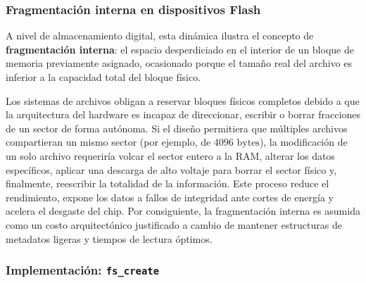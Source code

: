 \documentclass[12pt,letterpaper]{article}
\begin{document}
\subsubsection*{Fragmentación interna en dispositivos Flash}
A nivel de almacenamiento digital, esta dinámica ilustra el concepto de \textbf{fragmentación interna}: el
espacio desperdiciado en el interior de un bloque de memoria previamente asignado, ocasionado porque el tamaño
real del archivo es inferior a la capacidad total del bloque físico.

Los sistemas de archivos obligan a reservar bloques físicos completos debido a que la arquitectura del hardware
es incapaz de direccionar, escribir o borrar fracciones de un sector de forma autónoma. Si el diseño permitiera
que múltiples archivos compartieran un mismo sector (por ejemplo, de $4096\text{ bytes}$), la modificación de un
solo archivo requeriría volcar el sector entero a la RAM, alterar los datos específicos, aplicar una descarga de
alto voltaje para borrar el sector físico y, finalmente, reescribir la totalidad de la información. Este proceso
reduce el rendimiento, expone los datos a fallos de integridad ante cortes de energía y acelera el desgaste del
chip. Por consiguiente, la fragmentación interna es asumida como un costo arquitectónico justificado a cambio de
mantener estructuras de metadatos ligeras y tiempos de lectura óptimos.

\subsubsection*{Implementación: \texttt{fs\_create}}
\end{document}
